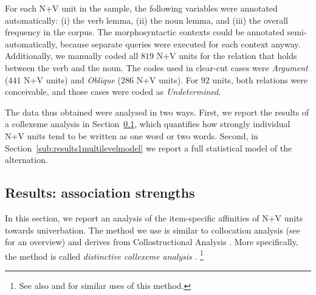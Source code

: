 \documentclass[biblatex, charis, linguex]{glossa}\usepackage{knitr}
\newcommand{\Sub}[1]{\ensuremath{\mathrm{_{#1}}}}
\begin{document}
For each N+V unit in the sample, the following variables were annotated automatically: (i) the verb lemma, (ii) the noun lemma, and (iii) the overall frequency in the corpus.
The morphosyntactic contexts could be annotated semi-automatically, because separate queries were executed for each context anyway.
Additionally, we manually coded all $819$ N+V units for the relation that holds between the verb and the noun.
The codes used in clear-cut cases were \textit{Argument} ($441$ N+V units) and \textit{Oblique} ($286$ N+V units).
For $92$ units, both relations were conceivable, and those cases were coded as \textit{Undetermined}.
%

The data thus obtained were analysed in two ways.
First, we report the results of a collexeme analysis in Section~\ref{sub:results2associationastrengths}, which quantifies how strongly individual N+V units tend to be written as one word or two words.
Second, in Section~\ref{sub:results1multilevelmodel} we report a full statistical model of the alternation.

\subsection{Results: association strengths}
\label{sub:results2associationastrengths}

In this section, we report an analysis of the item-specific affinities of N+V units towards univerbation.
The method we use is similar to collocation analysis (see \citealt{Evert2008} for an overview) and derives from Collostructional Analysis \parencite{StefanowitschGries2003}.
More specifically, the method is called \textit{distinctive collexeme analysis} \parencite{StefanowitschGries2009}.%
\footnote{See also \citet{SchaeferPankratz2018} and \citet{Schaefer2019a} for similar uses of this method.}
\end{document}
